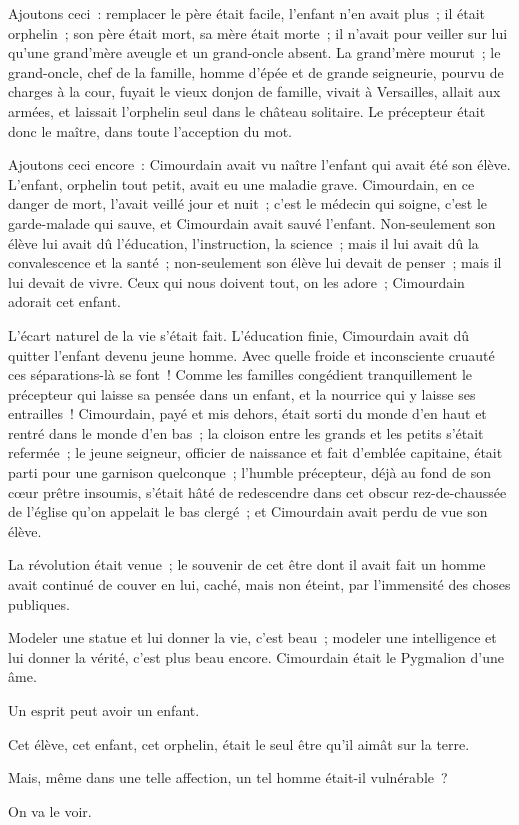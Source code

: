 \documentclass[french,twoside]{book} %
\begin{document}
Ajoutons ceci : remplacer le père était facile, l’enfant n’en avait plus ; il était orphelin ; son père était mort, sa mère était morte ; il n’avait pour veiller sur lui qu’une grand’mère aveugle et un grand-oncle absent. La grand’mère mourut ; le grand-oncle, chef de la famille, homme d’épée et de grande seigneurie, pourvu de charges à la cour, fuyait le vieux donjon de famille, vivait à Versailles, allait aux armées, et  laissait l’orphelin seul dans le château solitaire. Le précepteur était donc le maître, dans toute l’acception du mot.\par
Ajoutons ceci encore : Cimourdain avait vu naître l’enfant qui avait été son élève. L’enfant, orphelin tout petit, avait eu une maladie grave. Cimourdain, en ce danger de mort, l’avait veillé jour et nuit ; c’est le médecin qui soigne, c’est le garde-malade qui sauve, et Cimourdain avait sauvé l’enfant. Non-seulement son élève lui avait dû l’éducation, l’instruction, la science ; mais il lui avait dû la convalescence et la santé ; non-seulement son élève lui devait de penser ; mais il lui devait de vivre. Ceux qui nous doivent tout, on les adore ; Cimourdain adorait cet enfant.\par
L’écart naturel de la vie s’était fait. L’éducation finie, Cimourdain avait dû quitter l’enfant devenu jeune homme. Avec quelle froide et inconsciente cruauté ces séparations-là se font ! Comme les familles congédient tranquillement le précepteur qui laisse sa pensée dans un enfant, et la nourrice qui y laisse ses entrailles ! Cimourdain, payé et mis dehors, était sorti du monde d’en haut et rentré dans le monde d’en bas ; la cloison entre les grands et les petits s’était refermée ; le jeune seigneur, officier de naissance et fait d’emblée capitaine, était parti pour une garnison quelconque ; l’humble précepteur, déjà au fond de son cœur prêtre insoumis, s’était hâté de redescendre dans cet obscur rez-de-chaussée de l’église qu’on appelait le bas clergé ; et Cimourdain avait perdu de vue son élève.\par
La révolution était venue ; le souvenir de cet être  dont il avait fait un homme avait continué de couver en lui, caché, mais non éteint, par l’immensité des choses publiques.\par
Modeler une statue et lui donner la vie, c’est beau ; modeler une intelligence et lui donner la vérité, c’est plus beau encore. Cimourdain était le Pygmalion d’une âme.\par
Un esprit peut avoir un enfant.\par
Cet élève, cet enfant, cet orphelin, était le seul être qu’il aimât sur la terre.\par
Mais, même dans une telle affection, un tel homme était-il vulnérable ?\par
On va le voir.\par
\end{document}
